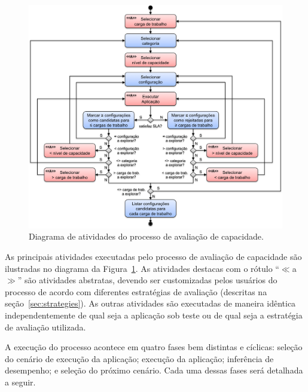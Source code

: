 \documentclass[12pt]{article}
\begin{document}
\begin{figure}[t]
  \begin{center}
    \includegraphics[trim = 20mm 6mm 20mm 5mm, scale=.65]{img/capacity-planning-diagram-v13-1-color-por}
  \end{center}
  \caption{\label{fig:fig_processo_aval_capacidade}Diagrama de atividades do processo de avaliação de capacidade.}
\end{figure}


As principais atividades executadas pelo processo de avaliação de capacidade são ilustradas no diagrama da Figura~\ref{fig:fig_processo_aval_capacidade}. As atividades destacas com o rótulo ``\mbox{\boldmath$\ll${\sc a}$\gg$}'' são atividades abstratas, devendo ser customizadas pelos usuários do processo de acordo com diferentes estratégias de avaliação (descritas na seção~\ref{sec:strategies}). As outras atividades são executadas de maneira idêntica independentemente de qual seja a aplicação sob teste ou de qual seja a estratégia de avaliação utilizada. 

A execução do processo acontece em quatro fases bem distintas e cíclicas: seleção do cenário de execução da aplicação; execução da aplicação; inferência de desempenho; e seleção do próximo cenário. Cada uma dessas fases será detalhada a seguir.
\end{document}
